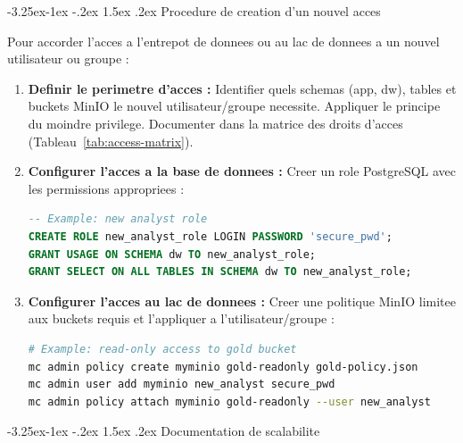 \documentclass[a4paper,11pt,oneside,openany]{report}
\makeatletter
\renewcommand\subsection{\@startsection{subsection}{2}{\z@}%
  {-3.25ex\@plus -1ex \@minus -.2ex}%
  {1.5ex \@plus .2ex}%
  {\normalfont\large\bfseries\color{ntdarkgreen}}}
\makeatother
\begin{document}
\subsection{Procedure de creation d'un nouvel acces}

Pour accorder l'acces a l'entrepot de donnees ou au lac de donnees a un
nouvel utilisateur ou groupe :

\begin{enumerate}[nosep]
  \item \textbf{Definir le perimetre d'acces :} Identifier quels schemas (app, dw),
        tables et buckets MinIO le nouvel utilisateur/groupe necessite. Appliquer
        le principe du moindre privilege. Documenter dans la matrice des droits
        d'acces (Tableau~\ref{tab:access-matrix}).
  \item \textbf{Configurer l'acces a la base de donnees :} Creer un role
        PostgreSQL avec les permissions appropriees :
        \begin{lstlisting}[language=SQL, numbers=none, frame=none, xleftmargin=0em, framexleftmargin=0em]
-- Example: new analyst role
CREATE ROLE new_analyst_role LOGIN PASSWORD 'secure_pwd';
GRANT USAGE ON SCHEMA dw TO new_analyst_role;
GRANT SELECT ON ALL TABLES IN SCHEMA dw TO new_analyst_role;
        \end{lstlisting}
  \item \textbf{Configurer l'acces au lac de donnees :} Creer une politique
        MinIO limitee aux buckets requis et l'appliquer a l'utilisateur/groupe :
        \begin{lstlisting}[language=bash, numbers=none, frame=none, xleftmargin=0em, framexleftmargin=0em]
# Example: read-only access to gold bucket
mc admin policy create myminio gold-readonly gold-policy.json
mc admin user add myminio new_analyst secure_pwd
mc admin policy attach myminio gold-readonly --user new_analyst
        \end{lstlisting}
\end{enumerate}

\subsection{Documentation de scalabilite}
\end{document}
